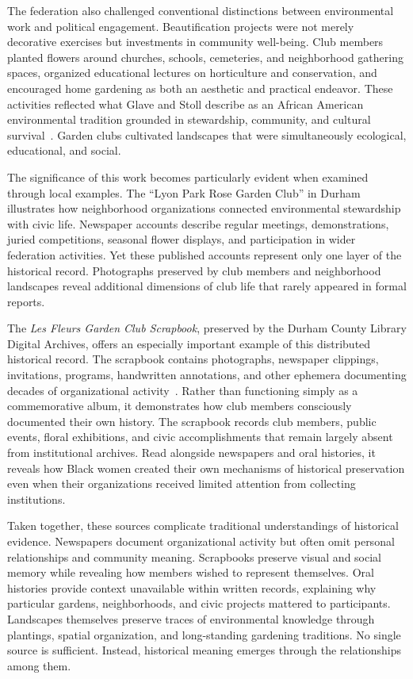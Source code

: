 \documentclass[final]{anthology-ch}
\begin{document}
The federation also challenged conventional distinctions between environmental work and political engagement. Beautification projects were not merely decorative exercises but investments in community well-being. Club members planted flowers around churches, schools, cemeteries, and neighborhood gathering spaces, organized educational lectures on horticulture and conservation, and encouraged home gardening as both an aesthetic and practical endeavor. These activities reflected what Glave and Stoll describe as an African American environmental tradition grounded in stewardship, community, and cultural survival~\cite{glave2006love}. Garden clubs cultivated landscapes that were simultaneously ecological, educational, and social.

The significance of this work becomes particularly evident when examined through local examples. The \enquote{Lyon Park Rose Garden Club} in Durham illustrates how neighborhood organizations connected environmental stewardship with civic life. Newspaper accounts describe regular meetings, demonstrations, juried competitions, seasonal flower displays, and participation in wider federation activities. Yet these published accounts represent only one layer of the historical record. Photographs preserved by club members and neighborhood landscapes reveal additional dimensions of club life that rarely appeared in formal reports.

The \textit{Les Fleurs Garden Club Scrapbook}, preserved by the Durham County Library Digital Archives, offers an especially important example of this distributed historical record. The scrapbook contains photographs, newspaper clippings, invitations, programs, handwritten annotations, and other ephemera documenting decades of organizational activity~\cite{lesfleurs}. Rather than functioning simply as a commemorative album, it demonstrates how club members consciously documented their own history. The scrapbook records club members, public events, floral exhibitions, and civic accomplishments that remain largely absent from institutional archives. Read alongside newspapers and oral histories, it reveals how Black women created their own mechanisms of historical preservation even when their organizations received limited attention from collecting institutions.

Taken together, these sources complicate traditional understandings of historical evidence. Newspapers document organizational activity but often omit personal relationships and community meaning. Scrapbooks preserve visual and social memory while revealing how members wished to represent themselves. Oral histories provide context unavailable within written records, explaining why particular gardens, neighborhoods, and civic projects mattered to participants. Landscapes themselves preserve traces of environmental knowledge through plantings, spatial organization, and long-standing gardening traditions. No single source is sufficient. Instead, historical meaning emerges through the relationships among them.
\end{document}
